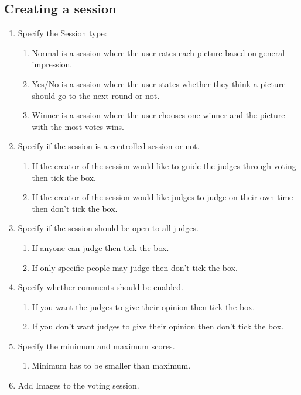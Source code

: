 \documentclass[10pt,a4paper]{article}
\begin{document}
\subsection{Creating a session}
\begin{enumerate}
\item Specify the Session type:
\begin{enumerate}
\item Normal is a session where the user rates each picture based on general impression.
\item Yes/No is a session where the user states whether they think a picture should go to the next round or not.
\item Winner is a session where the user chooses one winner and the picture with the most votes wins.
\end{enumerate}
\item Specify if the session is a controlled session or not.
\begin{enumerate}
\item If the creator of the session would like to guide the judges through voting then tick the box.
\item If the creator of the session would like judges to judge on their own time then don't tick the box.
\end{enumerate}
\item Specify if the session should be open to all judges.
\begin{enumerate}
\item If anyone can judge then tick the box.
\item If only specific people may judge then don't tick the box.
\end{enumerate}
\item Specify whether comments should be enabled.
\begin{enumerate}
\item If you want the judges to give their opinion then tick the box.
\item If you don't want judges to give their opinion then don't tick the box.
\end{enumerate}
\item Specify the minimum and maximum scores.
\begin{enumerate}
\item Minimum has to be smaller than maximum.
\end{enumerate}
\item Add Images to the voting session.
\begin{enumerate}

\end{enumerate}
\end{enumerate}
\end{document}
